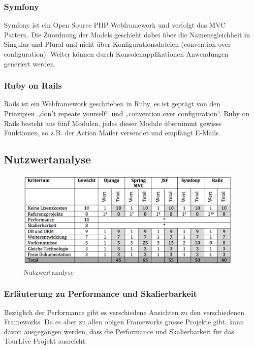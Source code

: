 \subsubsection{Symfony}
Symfony ist ein Open Source PHP Webframework und verfolgt das MVC Pattern. Die Zuordnung der Models geschieht dabei über die Namensgleichheit in Singular und Plural und nicht über Konfigurationsdateien (convention over configuration). Weiter können durch Konsolenapplikationen Anwendungen generiert werden.
\subsubsection{Ruby on Rails}
Rails ist ein Webframework geschrieben in Ruby, es ist geprägt von den Prinzipien „don’t repeate yourself“ und „convention over configuration“. Ruby on Rails besteht aus fünf Modulen, jedes dieser Module übernimmt gewisse Funktionen, so z.B. der Action Mailer versendet und empfängt E-Mails.
\subsection{Nutzwertanalyse}
\begin{figure}[H]
	\includegraphics[width=130mm]{images/nutzwertanalyse.png}
	\caption{Nutzwertanalyse}
\end{figure}
\subsubsection{Erläuterung zu Performance und Skalierbarkeit}
Bezüglich der Performance gibt es verschiedene Ansichten zu den verschiedenen Frameworks. Da es aber zu allen obigen Frameworks grosse Projekte gibt, kann davon ausgegangen werden, dass die Performance und Skalierbarkeit für das TourLive Projekt ausreicht.
